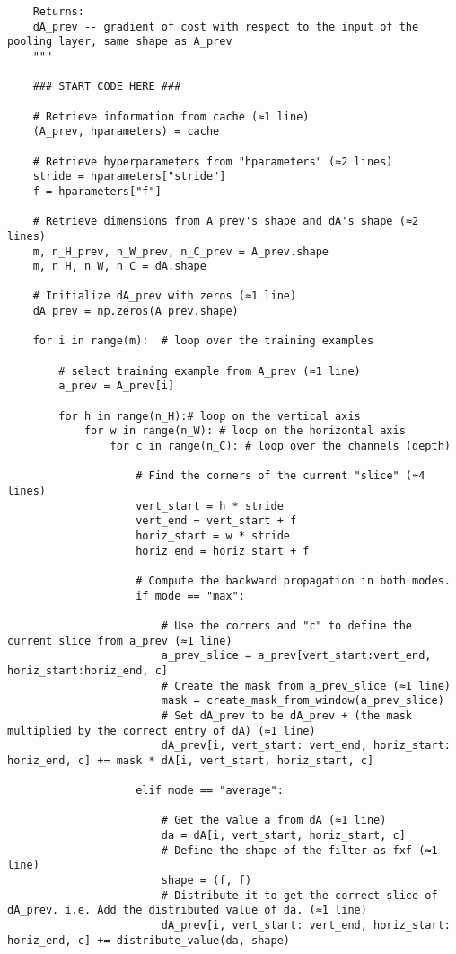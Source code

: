 {\begin{itemize}
\begin{verbatim}
    Returns:
    dA_prev -- gradient of cost with respect to the input of the pooling layer, same shape as A_prev
    """
    
    ### START CODE HERE ###
    
    # Retrieve information from cache (≈1 line)
    (A_prev, hparameters) = cache
    
    # Retrieve hyperparameters from "hparameters" (≈2 lines)
    stride = hparameters["stride"]
    f = hparameters["f"]
    
    # Retrieve dimensions from A_prev's shape and dA's shape (≈2 lines)
    m, n_H_prev, n_W_prev, n_C_prev = A_prev.shape
    m, n_H, n_W, n_C = dA.shape
    
    # Initialize dA_prev with zeros (≈1 line)
    dA_prev = np.zeros(A_prev.shape)
    
    for i in range(m):  # loop over the training examples
        
        # select training example from A_prev (≈1 line)
        a_prev = A_prev[i]
        
        for h in range(n_H):# loop on the vertical axis
            for w in range(n_W): # loop on the horizontal axis
                for c in range(n_C): # loop over the channels (depth)
                    
                    # Find the corners of the current "slice" (≈4 lines)
                    vert_start = h * stride
                    vert_end = vert_start + f
                    horiz_start = w * stride
                    horiz_end = horiz_start + f
                    
                    # Compute the backward propagation in both modes.
                    if mode == "max":
                        
                        # Use the corners and "c" to define the current slice from a_prev (≈1 line)
                        a_prev_slice = a_prev[vert_start:vert_end, horiz_start:horiz_end, c]
                        # Create the mask from a_prev_slice (≈1 line)
                        mask = create_mask_from_window(a_prev_slice)
                        # Set dA_prev to be dA_prev + (the mask multiplied by the correct entry of dA) (≈1 line)
                        dA_prev[i, vert_start: vert_end, horiz_start: horiz_end, c] += mask * dA[i, vert_start, horiz_start, c]
                        
                    elif mode == "average":
                        
                        # Get the value a from dA (≈1 line)
                        da = dA[i, vert_start, horiz_start, c]
                        # Define the shape of the filter as fxf (≈1 line)
                        shape = (f, f)
                        # Distribute it to get the correct slice of dA_prev. i.e. Add the distributed value of da. (≈1 line)
                        dA_prev[i, vert_start: vert_end, horiz_start: horiz_end, c] += distribute_value(da, shape)
                        

\end{verbatim}
\end{itemize}}
